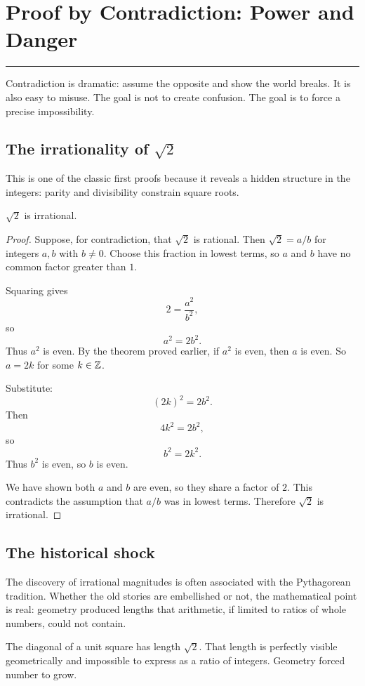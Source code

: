 \documentclass[12pt]{article}
\newcommand{\chapterline}{\vspace{0.4em}\hrule\vspace{0.8em}}
\begin{document}
\newpage
\section{Proof by Contradiction: Power and Danger}
\chapterline

Contradiction is dramatic: assume the opposite and show the world breaks. It is also easy to misuse. The goal is not to create confusion. The goal is to force a precise impossibility.

\subsection{The irrationality of $\sqrt2$}

This is one of the classic first proofs because it reveals a hidden structure in the integers: parity and divisibility constrain square roots.

\begin{theorem}
$\sqrt2$ is irrational.
\end{theorem}

\begin{proof}
Suppose, for contradiction, that $\sqrt2$ is rational. Then $\sqrt2=a/b$ for integers $a,b$ with $b\neq0$. Choose this fraction in lowest terms, so $a$ and $b$ have no common factor greater than $1$.

Squaring gives
\[
2=\frac{a^2}{b^2},
\]
so
\[
a^2=2b^2.
\]
Thus $a^2$ is even. By the theorem proved earlier, if $a^2$ is even, then $a$ is even. So $a=2k$ for some $k\in\mathbb{Z}$.

Substitute:
\[
(2k)^2=2b^2.
\]
Then
\[
4k^2=2b^2,
\]
so
\[
b^2=2k^2.
\]
Thus $b^2$ is even, so $b$ is even.

We have shown both $a$ and $b$ are even, so they share a factor of $2$. This contradicts the assumption that $a/b$ was in lowest terms. Therefore $\sqrt2$ is irrational.
\end{proof}

\subsection{The historical shock}

The discovery of irrational magnitudes is often associated with the Pythagorean tradition. Whether the old stories are embellished or not, the mathematical point is real: geometry produced lengths that arithmetic, if limited to ratios of whole numbers, could not contain.

The diagonal of a unit square has length $\sqrt2$. That length is perfectly visible geometrically and impossible to express as a ratio of integers. Geometry forced number to grow.
\end{document}
